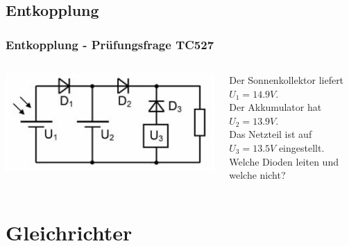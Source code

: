 \subsection*{Entkopplung}
\begin{frame}
    \frametitle{Entkopplung - Prüfungsfrage TC527}
    \begin{columns}[c]
        \begin{center}
            \includegraphics[width=1\textwidth]{a05/TC527.png}\\
            \tiny \hyperlink{refs}{\cite{bna}}
    \end{center}
	Der Sonnenkollektor liefert $U_1 = 14.9V$. \\[0.2em]
	Der Akkumulator hat $U_2 = 13.9V$. \\[0.2em]
	Das Netzteil ist auf $U_3 = 13.5V$ eingestellt. \\[1.2em]
	Welche Dioden leiten und welche nicht?
    \end{columns}
\end{frame}

\section*{Gleichrichter}

